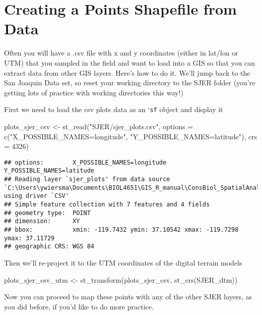 \documentclass[
]{book}
\newenvironment{Shaded}{\begin{snugshade}}{\end{snugshade}}
\newcommand{\AttributeTok}[1]{\textcolor[rgb]{0.77,0.63,0.00}{#1}}
\newcommand{\DecValTok}[1]{\textcolor[rgb]{0.00,0.00,0.81}{#1}}
\newcommand{\FunctionTok}[1]{\textcolor[rgb]{0.00,0.00,0.00}{#1}}
\newcommand{\NormalTok}[1]{#1}
\newcommand{\OtherTok}[1]{\textcolor[rgb]{0.56,0.35,0.01}{#1}}
\newcommand{\StringTok}[1]{\textcolor[rgb]{0.31,0.60,0.02}{#1}}
\begin{document}
\hypertarget{PointsData}{%
\chapter{Creating a Points Shapefile from Data}\label{PointsData}}

Often you will have a .csv file with x and y coordinates (either in lat/lon or UTM) that you sampled in the field and want to load into a GIS so that you can extract data from other GIS layers. Here's how to do it. We'll jump back to the San Joaquin Data set, so reset your working directory to the SJER folder (you're getting lots of practice with working directories this way!)

First we need to load the csv plots data as an `\texttt{sf} object and display it

\begin{Shaded}
\begin{Highlighting}[]
\NormalTok{plots\_sjer\_csv }\OtherTok{\textless{}{-}} \FunctionTok{st\_read}\NormalTok{(}\StringTok{"SJER/sjer\_plots.csv"}\NormalTok{, }\AttributeTok{options =} \FunctionTok{c}\NormalTok{(}\StringTok{"X\_POSSIBLE\_NAMES=longitude"}\NormalTok{, }\StringTok{"Y\_POSSIBLE\_NAMES=latitude"}\NormalTok{), }\AttributeTok{crs =} \DecValTok{4326}\NormalTok{)}
\end{Highlighting}
\end{Shaded}

\begin{verbatim}
## options:        X_POSSIBLE_NAMES=longitude Y_POSSIBLE_NAMES=latitude 
## Reading layer `sjer_plots' from data source `C:\Users\ywiersma\Documents\BIOL4651\GIS_R_manual\ConsBiol_SpatialAnalysis\SJER\sjer_plots.csv' using driver `CSV'
## Simple feature collection with 7 features and 4 fields
## geometry type:  POINT
## dimension:      XY
## bbox:           xmin: -119.7432 ymin: 37.10542 xmax: -119.7298 ymax: 37.11729
## geographic CRS: WGS 84
\end{verbatim}

Then we'll re-project it to the UTM coordinates of the digital terrain models

\begin{Shaded}
\begin{Highlighting}[]
\NormalTok{plots\_sjer\_csv\_utm }\OtherTok{\textless{}{-}} \FunctionTok{st\_transform}\NormalTok{(plots\_sjer\_csv, }\FunctionTok{st\_crs}\NormalTok{(SJER\_dtm))}
\end{Highlighting}
\end{Shaded}

Now you can proceed to map these points with any of the other SJER layers, as you did before, if you'd like to do more practice.

  
\end{document}
